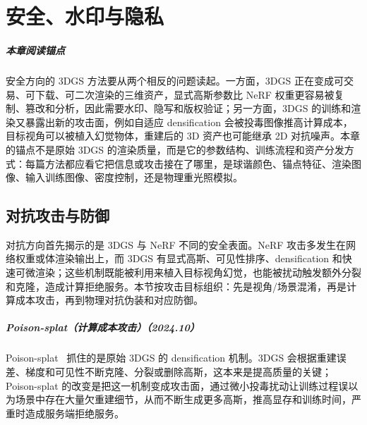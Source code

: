 ﻿\chapter{安全、水印与隐私}

\paragraph*{本章阅读锚点}
安全方向的 3DGS 方法要从两个相反的问题读起。一方面，3DGS 正在变成可交易、可下载、可二次渲染的三维资产，显式高斯参数比 NeRF 权重更容易被复制、篡改和分析，因此需要水印、隐写和版权验证；另一方面，3DGS 的训练和渲染又暴露出新的攻击面，例如自适应 densification 会被投毒图像推高计算成本，目标视角可以被植入幻觉物体，重建后的 3D 资产也可能继承 2D 对抗噪声。本章的锚点不是原始 3DGS 的渲染质量，而是它的参数结构、训练流程和资产分发方式：每篇方法都应看它把信息或攻击接在了哪里，是球谐颜色、锚点特征、渲染图像、输入训练图像、密度控制，还是物理重光照模拟。

\section{对抗攻击与防御}

对抗方向首先揭示的是 3DGS 与 NeRF 不同的安全表面。NeRF 攻击多发生在网络权重或体渲染输出上，而 3DGS 有显式高斯、可见性排序、densification 和快速可微渲染；这些机制既能被利用来植入目标视角幻觉，也能被扰动触发额外分裂和克隆，造成计算拒绝服务。本节按攻击目标组织：先是视角/场景混淆，再是计算成本攻击，再到物理对抗伪装和对应防御。



\paragraph{Poison-splat（计算成本攻击）（2024.10）}
Poison-splat~\cite{2410_08190} 抓住的是原始 3DGS 的 densification 机制。3DGS 会根据重建误差、梯度和可见性不断克隆、分裂或删除高斯，这本来是提高质量的关键；Poison-splat 的改变是把这一机制变成攻击面，通过微小投毒扰动让训练过程误以为场景中存在大量欠重建细节，从而不断生成更多高斯，推高显存和训练时间，严重时造成服务端拒绝服务。


